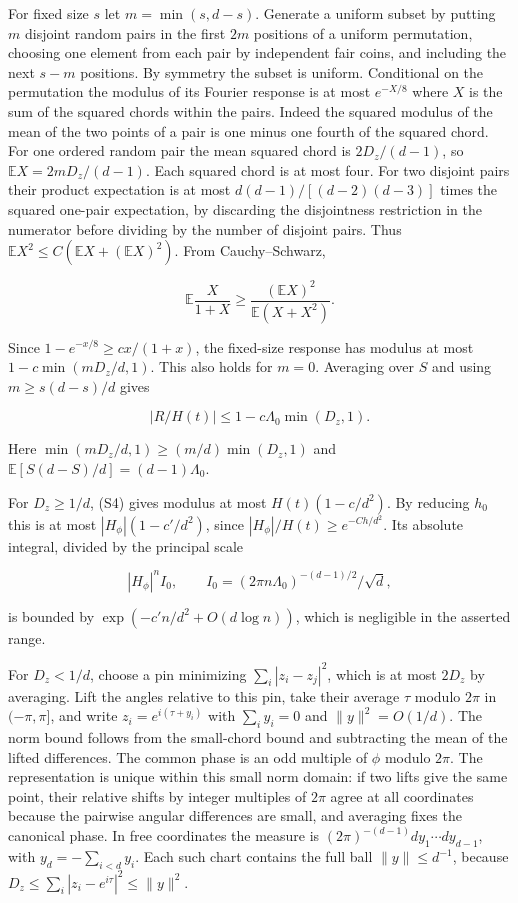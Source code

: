 For fixed size $s$ let $m=\min(s,d-s)$. Generate a uniform subset by putting $m$ disjoint random pairs in the first $2m$ positions of a uniform permutation, choosing one element from each pair by independent fair coins, and including the next $s-m$ positions. By symmetry the subset is uniform. Conditional on the permutation the modulus of its Fourier response is at most $e^{-X/8}$ where $X$ is the sum of the squared chords within the pairs. Indeed the squared modulus of the mean of the two points of a pair is one minus one fourth of the squared chord. For one ordered random pair the mean squared chord is $2D_z/(d-1)$, so $\mathbb E X=2mD_z/(d-1)$. Each squared chord is at most four. For two disjoint pairs their product expectation is at most $d(d-1)/[(d-2)(d-3)]$ times the squared one-pair expectation, by discarding the disjointness restriction in the numerator before dividing by the number of disjoint pairs. Thus $\mathbb E X^2\le C(\mathbb EX+(\mathbb EX)^2)$. From Cauchy--Schwarz,

\begin{equation*}
\mathbb E\frac{X}{1+X}\ge
\frac{(\mathbb E X)^2}{\mathbb E(X+X^2)}.
\end{equation*}

Since $1-e^{-x/8}\ge c x/(1+x)$, the fixed-size response has modulus at most $1-c\min(mD_z/d,1)$. This also holds for $m=0$. Averaging over $S$ and using $m\ge s(d-s)/d$ gives

\begin{equation}
|R/H(t)|\le1-c\Lambda_0\min(D_z,1).
\tag{S4}
\end{equation}

Here $\min(mD_z/d,1)\ge(m/d)\min(D_z,1)$ and $\mathbb E[S(d-S)/d]=(d-1)\Lambda_0$.

For $D_z\ge1/d$, (S4) gives modulus at most $H(t)(1-c/d^2)$. By reducing $h_0$ this is at most $|H_\phi|(1-c'/d^2)$, since $|H_\phi|/H(t)\ge e^{-Ch/d^2}$. Its absolute integral, divided by the principal scale

\begin{equation*}
|H_\phi|^n I_0,\qquad I_0=(2\pi n\Lambda_0)^{-(d-1)/2}/\sqrt d,
\end{equation*}

is bounded by $\exp(-c'n/d^2+O(d\log n))$, which is negligible in the asserted range.

For $D_z<1/d$, choose a pin minimizing $\sum_i|z_i-z_j|^2$, which is at most $2D_z$ by averaging. Lift the angles relative to this pin, take their average $\tau$ modulo $2\pi$ in $(-\pi,\pi]$, and write $z_i=e^{i(\tau+y_i)}$ with $\sum_i y_i=0$ and $\|y\|^2=O(1/d)$. The norm bound follows from the small-chord bound and subtracting the mean of the lifted differences. The common phase is an odd multiple of $\phi$ modulo $2\pi$. The representation is unique within this small norm domain: if two lifts give the same point, their relative shifts by integer multiples of $2\pi$ agree at all coordinates because the pairwise angular differences are small, and averaging fixes the canonical phase. In free coordinates the measure is $(2\pi)^{-(d-1)}dy_1\cdots dy_{d-1}$, with $y_d=-\sum_{i<d}y_i$. Each such chart contains the full ball $\|y\|\le d^{-1}$, because $D_z\le\sum_i|z_i-e^{i\tau}|^2\le \|y\|^2$.

